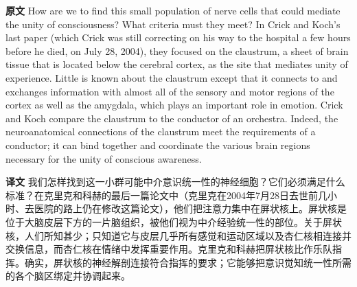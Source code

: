 \documentclass[UTF8]{ctexart}
\newenvironment{english}{\par\small\noindent\textbf{原文}\quad\ignorespaces}{\par}
\newenvironment{zhtranslation}{\par\noindent\textbf{译文}\quad\ignorespaces}{\par\vspace{0.35em}}
\begin{document}
\begin{english}
How are we to find this small population of nerve cells that could mediate the unity of consciousness? What criteria must they meet? In Crick and Koch's last paper (which Crick was still correcting on his way to the hospital a few hours before he died, on July 28, 2004), they focused on the claustrum, a sheet of brain tissue that is located below the cerebral cortex, as the site that mediates unity of experience. Little is known about the claustrum except that it connects to and exchanges information with almost all of the sensory and motor regions of the cortex as well as the amygdala, which plays an important role in emotion. Crick and Koch compare the claustrum to the conductor of an orchestra. Indeed, the neuroanatomical connections of the claustrum meet the requirements of a conductor; it can bind together and coordinate the various brain regions necessary for the unity of conscious awareness.
\end{english}
\begin{zhtranslation}
我们怎样找到这一小群可能中介意识统一性的神经细胞？它们必须满足什么标准？在克里克和科赫的最后一篇论文中（克里克在2004年7月28日去世前几小时、去医院的路上仍在修改这篇论文），他们把注意力集中在屏状核上。屏状核是位于大脑皮层下方的一片脑组织，被他们视为中介经验统一性的部位。关于屏状核，人们所知甚少；只知道它与皮层几乎所有感觉和运动区域以及杏仁核相连接并交换信息，而杏仁核在情绪中发挥重要作用。克里克和科赫把屏状核比作乐队指挥。确实，屏状核的神经解剖连接符合指挥的要求；它能够把意识觉知统一性所需的各个脑区绑定并协调起来。\end{zhtranslation}
\end{document}
